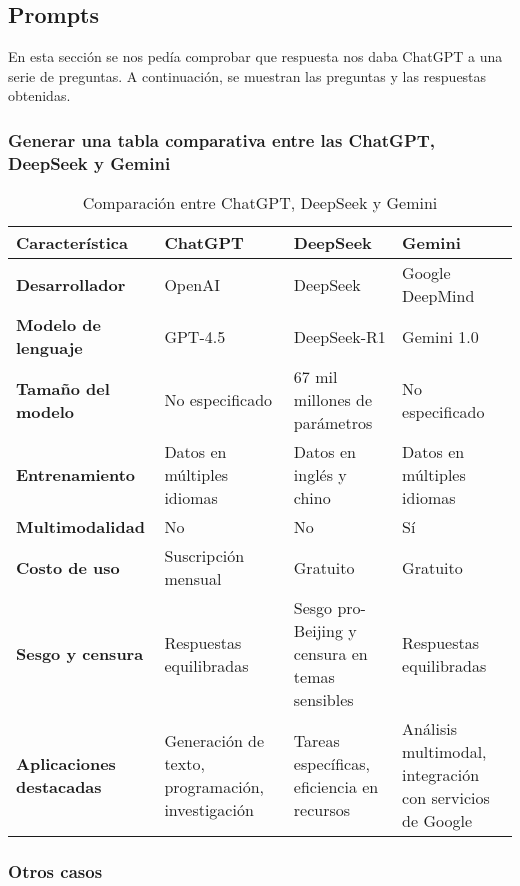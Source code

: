 \documentclass[a4paper,12pt]{article}
\begin{document}
\subsection{Prompts}
En esta sección se nos pedía comprobar que respuesta nos daba ChatGPT a una serie de preguntas. A continuación, se muestran las preguntas y las respuestas obtenidas.

\subsubsection*{Generar una tabla comparativa entre las ChatGPT, DeepSeek y Gemini}

\begin{table}[H]
    \centering
    \renewcommand{\arraystretch}{1.3}
    \begin{tabular}{|l|p{3cm}|p{3cm}|p{3cm}|}
        \hline
        \textbf{Característica} & \textbf{ChatGPT} & \textbf{DeepSeek} & \textbf{Gemini} \\
        \hline
        \textbf{Desarrollador} & OpenAI & DeepSeek & Google DeepMind \\
        \hline
        \textbf{Modelo de lenguaje} & GPT-4.5 & DeepSeek-R1 & Gemini 1.0 \\
        \hline
        \textbf{Tamaño del modelo} & No especificado & 67 mil millones de parámetros & No especificado \\
        \hline
        \textbf{Entrenamiento} & Datos en múltiples idiomas & Datos en inglés y chino & Datos en múltiples idiomas \\
        \hline
        \textbf{Multimodalidad} & No & No & Sí \\
        \hline
        \textbf{Costo de uso} & Suscripción mensual & Gratuito & Gratuito \\
        \hline
        \textbf{Sesgo y censura} & Respuestas equilibradas & Sesgo pro-Beijing y censura en temas sensibles & Respuestas equilibradas \\
        \hline
        \textbf{Aplicaciones destacadas} & Generación de texto, programación, investigación & Tareas específicas, eficiencia en recursos & Análisis multimodal, integración con servicios de Google \\
        \hline
    \end{tabular}
    \caption{Comparación entre ChatGPT, DeepSeek y Gemini}
    \label{tab:comparacion_modelos}
\end{table}

\subsubsection{Otros casos}
\end{document}
